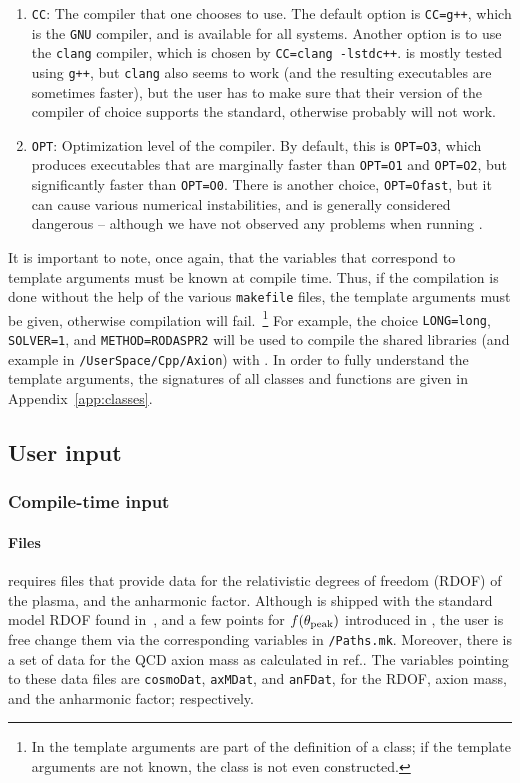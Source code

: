 \documentclass[11pt,a4paper]{article}
\begin{document}
\begin{enumerate}
	\item {\tt CC}: The \CPP compiler that one chooses to use. The default option is {\tt CC=g++}, which is the {\tt GNU} \CPP compiler, and is available for all systems. Another option is to use the {\tt clang} compiler, which is chosen by {\tt CC=clang -lstdc++}. \mimes is mostly tested using {\tt g++}, but {\tt clang} also seems to work (and the resulting executables are sometimes faster), but the user has to make sure that their version of the compiler of choice supports the  standard, otherwise \mimes probably will not work.
	\item {\tt OPT}: Optimization level of the compiler. By default, this is {\tt OPT=O3}, which produces executables that are marginally faster than {\tt OPT=O1} and {\tt OPT=O2}, but significantly faster than {\tt OPT=O0}. There is another choice, {\tt OPT=Ofast}, but it can cause various numerical instabilities, and is generally considered dangerous -- although we have not observed any problems when running \mimes. 
\end{enumerate}
%
It is important to note, once again, that the variables that correspond to template arguments must be known at compile time. Thus, if the compilation is done without the help of the various {\tt makefile} files, the template arguments must be given, otherwise compilation will fail.~\footnote{In \CPP the template arguments are part of the definition of a class; if the template arguments are not known, the class is not even constructed.} For example, the choice {\tt LONG=long}, {\tt SOLVER=1}, and {\tt METHOD=RODASPR2} will be used to compile the shared libraries (and \CPP example in {\tt \mimes/UserSpace/Cpp/Axion}) with . In order to fully understand the template arguments, the signatures of all classes and functions are given in Appendix~\ref{app:classes}.


\subsection{User input}\label{sec:input}
%
\subsubsection{Compile-time input}\label{sec:compile_time_input} 
%
\paragraph{Files} \mimes requires files that provide data for the relativistic degrees of freedom (RDOF) of the plasma, and the anharmonic factor. Although \mimes is shipped with the standard model RDOF found in~\cite{Saikawa:2020swg}, and a few points for $f(\theta_{\rm peak}{})$ introduced in , the user is free change them via the corresponding variables in {\tt \mimes/Paths.mk}. Moreover, there is a set of data for the QCD axion mass as calculated in ref.\cite{Borsanyi:2016ksw}.
%
The variables pointing to these data files are {\tt cosmoDat}, {\tt axMDat}, and {\tt anFDat}, for the RDOF, axion mass, and the anharmonic factor; respectively.
\end{document}
